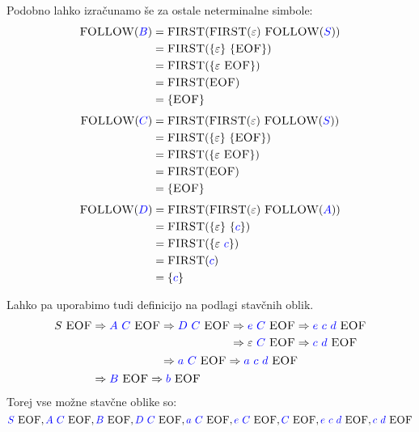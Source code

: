 \documentclass{article}
\newcommand{\FIRST}{\textsc{FIRST}}
\newcommand{\FOLLOW}{\textsc{FOLLOW}}
\newcommand{\EOF}{\textsc{EOF}}
\newcommand{\Symbol}[1]{\textcolor{blue}{#1}}
\newcommand{\Null}{\varepsilon}
\newcommand{\Derive}{\Rightarrow}
\newcommand{\Seq}{\ }
\begin{document}
Podobno lahko izračunamo še za ostale neterminalne simbole:
\begin{align*}
  \FOLLOW(\Symbol{B}) &= \FIRST(\FIRST(\Null) \Seq \FOLLOW(\Symbol{S})) \\
             &= \FIRST(\{\Null\} \Seq \{\EOF\})\\
             &= \FIRST(\{\Null \Seq \EOF\})\\
             &= \FIRST(\EOF) \\
             &= \{\EOF\}
\end{align*}
\begin{align*}
  \FOLLOW(\Symbol{C}) &= \FIRST(\FIRST(\Null) \Seq \FOLLOW(\Symbol{S})) \\
             &= \FIRST(\{\Null\} \Seq \{\EOF\})\\
             &= \FIRST(\{\Null \Seq \EOF\})\\
             &= \FIRST(\EOF) \\
             &= \{\EOF\}
\end{align*}
\begin{align*}
  \FOLLOW(\Symbol{D}) &= \FIRST(\FIRST(\Null) \Seq \FOLLOW(\Symbol{A})) \\
             &= \FIRST(\{\Null\} \Seq \{\Symbol{c}\})\\
             &= \FIRST(\{\Null \Seq \Symbol{c}\})\\
             &= \FIRST(\Symbol{c}) \\
             &= \{\Symbol{c}\}
\end{align*}

Lahko pa uporabimo tudi definicijo na podlagi stavčnih oblik.
\begin{equation*}
  S \Seq \EOF \begin{aligned}[t]
    &\Derive \Symbol{A} \Seq \Symbol{C} \Seq \EOF \begin{aligned}[t]
      &\Derive \Symbol{D} \Seq \Symbol{C} \Seq \EOF \begin{aligned}[t]
        &\Derive \Symbol{e} \Seq \Symbol{C} \Seq \EOF \Derive \Symbol{e} \Seq \Symbol{c} \Seq \Symbol{d} \Seq \EOF \\
        &\Derive \Null \Seq \Symbol{C} \Seq \EOF \Derive \Symbol{c} \Seq \Symbol{d} \Seq \EOF \\
      \end{aligned}\\
      &\Derive \Symbol{a} \Seq \Symbol{C} \Seq \EOF \Derive \Symbol{a} \Seq \Symbol{c} \Seq \Symbol{d} \Seq \EOF
    \end{aligned}\\
    &\Derive \Symbol{B} \Seq \EOF \Derive \Symbol{b} \Seq \EOF
  \end{aligned}
\end{equation*}
Torej vse možne stavčne oblike so:
\begin{equation*}
  \Symbol{S} \Seq \EOF, \Symbol{A} \Seq \Symbol{C} \Seq \EOF, \Symbol{B} \Seq \EOF, \Symbol{D} \Seq \Symbol{C} \Seq \EOF, \Symbol{a} \Seq \Symbol{C} \Seq \EOF, \Symbol{e} \Seq \Symbol{C} \Seq \EOF, \Symbol{C} \Seq \EOF, \Symbol{e} \Seq \Symbol{c} \Seq \Symbol{d} \Seq \EOF, \Symbol{c} \Seq \Symbol{d} \Seq \EOF
\end{equation*}
\end{document}
